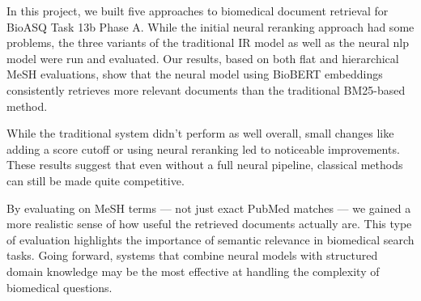 \documentclass[12pt]{article}
\begin{document}
In this project, we built five approaches to biomedical document retrieval for BioASQ Task 13b Phase A. While the initial neural reranking approach had some problems, the three variants of the traditional IR model as well as the neural nlp model were run and evaluated. Our results, based on both flat and hierarchical MeSH evaluations, show that the neural model using BioBERT embeddings consistently retrieves more relevant documents than the traditional BM25-based method.

While the traditional system didn't perform as well overall, small changes like adding a score cutoff or using neural reranking led to noticeable improvements. These results suggest that even without a full neural pipeline, classical methods can still be made quite competitive.

By evaluating on MeSH terms — not just exact PubMed matches — we gained a more realistic sense of how useful the retrieved documents actually are. This type of evaluation highlights the importance of semantic relevance in biomedical search tasks. Going forward, systems that combine neural models with structured domain knowledge may be the most effective at handling the complexity of biomedical questions.
\end{document}
